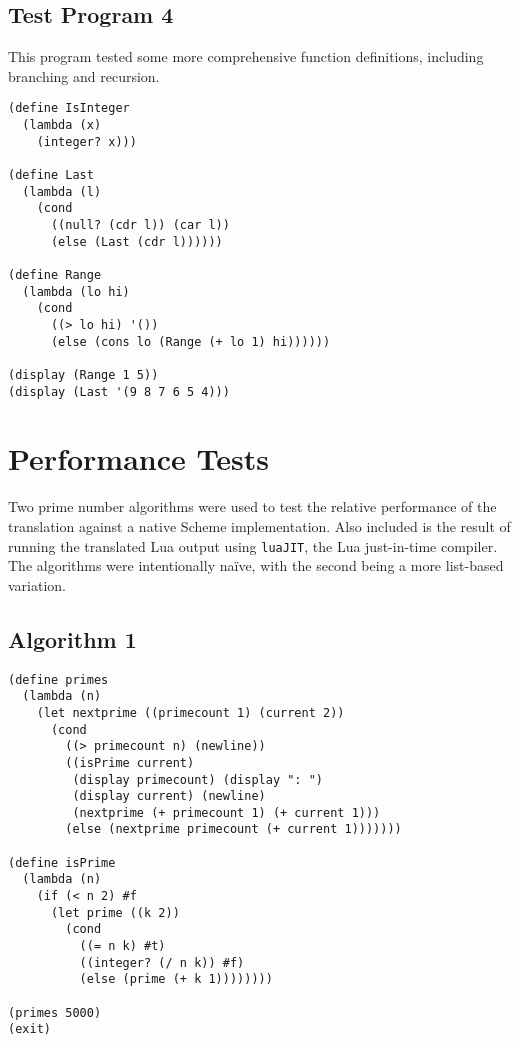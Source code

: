 \subsection{Test Program 4}
This program tested some more comprehensive function definitions, including
branching and recursion.
\begin{framed}
\begin{verbatim}
(define IsInteger
  (lambda (x)
    (integer? x)))

(define Last
  (lambda (l)
    (cond
      ((null? (cdr l)) (car l))
      (else (Last (cdr l))))))

(define Range
  (lambda (lo hi)
    (cond
      ((> lo hi) '())
      (else (cons lo (Range (+ lo 1) hi))))))

(display (Range 1 5))
(display (Last '(9 8 7 6 5 4)))
\end{verbatim}
\end{framed}


\section{Performance Tests}

Two prime number algorithms were used to test the relative performance of the
translation against a native Scheme implementation. Also included is the result
of running the translated Lua output using \texttt{luaJIT}, the Lua just-in-time
compiler. The algorithms were intentionally na\"{i}ve, with the second being
a more list-based variation.

\subsection{Algorithm 1}

\begin{framed}
\begin{verbatim}
(define primes
  (lambda (n)
    (let nextprime ((primecount 1) (current 2))
      (cond
        ((> primecount n) (newline))
        ((isPrime current)
         (display primecount) (display ": ")
         (display current) (newline)
         (nextprime (+ primecount 1) (+ current 1)))
        (else (nextprime primecount (+ current 1)))))))

(define isPrime
  (lambda (n)
    (if (< n 2) #f
      (let prime ((k 2))
        (cond
          ((= n k) #t)
          ((integer? (/ n k)) #f)
          (else (prime (+ k 1))))))))

(primes 5000)
(exit)
\end{verbatim}
\end{framed}

